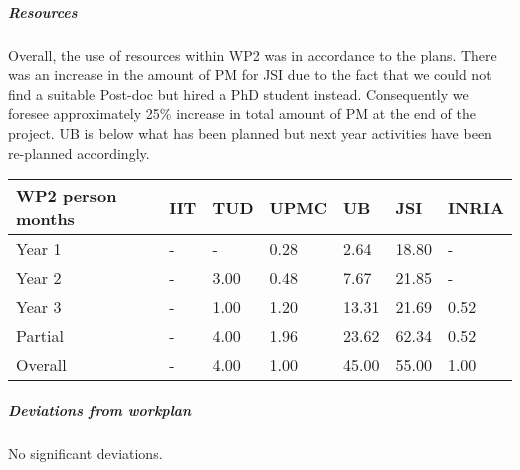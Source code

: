 
\subparagraph*{Resources}
Overall, the use of resources within WP2 was in accordance to the plans. There was an increase in the amount of PM for JSI due to the fact that we could not find a suitable Post-doc but hired a PhD student instead. Consequently we foresee approximately 25\% increase in total amount of PM at the end of the project. UB is below what has been planned but next year activities have been re-planned accordingly. 

\begin{center}
\begin{tabular}{|C{1.5cm}|C{1.5cm}|C{1.5cm}|C{2cm}|C{2cm}|C{2cm}|C{2cm}|}
\hline
\footnotesize \textbf{WP2 person months}& \footnotesize \textbf{IIT}&\footnotesize \textbf{TUD}&\footnotesize \textbf{UPMC}& \footnotesize \textbf{UB} &\footnotesize \textbf{JSI} & \footnotesize \textbf{INRIA} \\ \hline
\footnotesize Year 1 &  -     & - & 0.28 & 2.64 & 18.80  &-  \\  \hline
\footnotesize Year 2 &  -     & 3.00 & 0.48 & 7.67 & 21.85  &-  \\  \hline
\footnotesize Year 3 &  - & 1.00 & 1.20 & 13.31 & 21.69 & 0.52  \\ \hline
\footnotesize Partial &  - & 4.00 & 1.96 & 23.62 & 62.34 & 0.52 \\
\hline \hline
\footnotesize Overall & -     & 4.00 & 1.00 & 45.00 & 55.00 & 1.00 \\ \hline
\end{tabular}
\end{center}

\subparagraph*{Deviations from workplan} 
No significant deviations.
